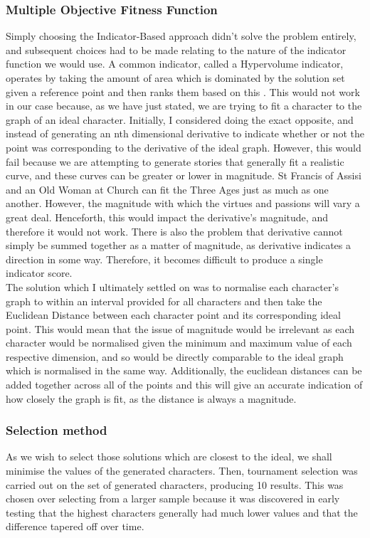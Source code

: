 \documentclass[12pt]{article}
\begin{document}
\subsubsection{Multiple Objective Fitness Function}
Simply choosing the Indicator-Based approach didn't solve the problem entirely, and subsequent choices had to be made relating to the nature of the indicator function we would use. A common indicator, called a Hypervolume indicator, operates by taking the amount of area which is dominated by the solution set given a reference point and then ranks them based on this \cite{AchievementScalarazingIndicatorBased}. This would not work in our case because, as we have just stated, we are trying to fit a character to the graph of an ideal character. Initially, I considered doing the exact opposite, and instead of generating an nth dimensional derivative to indicate whether or not the point was corresponding to the derivative of the ideal graph. However, this would fail because we are attempting to generate stories that generally fit a realistic curve, and these curves can be greater or lower in magnitude. St Francis of Assisi and an Old Woman at Church can fit the Three Ages just as much as one another. However, the magnitude with which the virtues and passions will vary a great deal. Henceforth, this would impact the derivative's magnitude, and therefore it would not work. There is also the problem that derivative cannot simply be summed together as a matter of magnitude, as derivative indicates a direction in some way. Therefore, it becomes difficult to produce a single indicator score.  \\

The solution which I ultimately settled on was to normalise each character's graph to within an interval provided for all characters and then take the Euclidean Distance between each character point and its corresponding ideal point. This would mean that the issue of magnitude would be irrelevant as each character would be normalised given the minimum and maximum value of each respective dimension, and so would be directly comparable to the ideal graph which is normalised in the same way. Additionally, the euclidean distances can be added together across all of the points and this will give an accurate indication of how closely the graph is fit, as the distance is always a magnitude. 

\subsubsection{Selection method}
As we wish to select those solutions which are closest to the ideal, we shall minimise the values of the generated characters. Then, tournament selection was carried out on the set of generated characters, producing 10 results. This was chosen over selecting from a larger sample because it was discovered in early testing that the highest characters generally had much lower values and that the difference tapered off over time. 
\end{document}
